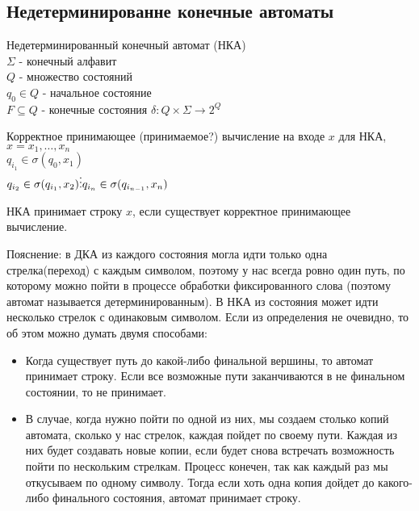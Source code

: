 \subsection{Недетерминированне конечные автоматы}

\begin{conj}
    Недетерминированный конечный автомат (НКА)\\
    $\Sigma$ - конечный алфавит\\
    $Q$ - множество состояний\\
    $q_0 \in Q$ - начальное состояние\\
    $F \subseteq Q$ - конечные состояния
    $\delta: Q \times \Sigma \to 2^Q$\\
\end{conj}
\begin{conj}
    Корректное принимающее (принимаемое?) вычисление на входе $x$ для НКА, $x = x_1, \dots, x_n$\\
    $q_{i_1} \in \sigma(q_0, x_1)$\\
    $q_{i_2} \in \sigma (q_{i_1}, x_2)\\
    \vdots\\
    q_{i_n} \in \sigma (q_{i_{n-1}}, x_n)\\$
\end{conj}

НКА принимает строку $x$, если существует корректное принимающее вычисление.

Пояснение: в ДКА из каждого состояния могла идти только одна стрелка(переход) с каждым символом, поэтому у нас всегда ровно один путь, по которому можно пойти в процессе обработки фиксированного слова (поэтому автомат называется детерминированным).
В НКА из состояния может идти несколько стрелок с одинаковым символом. Если из определения не очевидно, то об этом можно думать двумя способами:

\begin{itemize}
    \item Когда существует путь до какой-либо финальной вершины, то автомат принимает строку. Если все возможные пути заканчиваются в не финальном состоянии, то не принимает.
    \item В случае, когда нужно пойти по одной из них, мы создаем столько копий автомата, сколько у нас стрелок, каждая пойдет по своему пути. 
Каждая из них будет создавать новые копии, если будет снова встречать возможность пойти по нескольким стрелкам. Процесс конечен, так как каждый раз мы откусываем по одному символу. Тогда если хоть одна копия дойдет до какого-либо финального состояния, автомат принимает строку.
\end{itemize}

